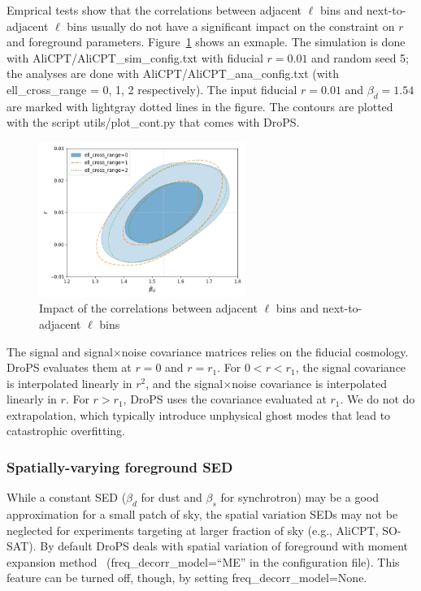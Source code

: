 \documentclass[12pt, a4paper]{ctexart} %
\begin{document}
Emprical tests show that the correlations between adjacent $\ell$ bins and next-to-adjacent $\ell$ bins usually do not have a significant impact on the constraint on $r$ and foreground parameters. Figure~\ref{fig:ell_cross_range} shows an exmaple. The simulation is done with AliCPT/AliCPT\_sim\_config.txt with fiducial $r=0.01$ and random seed 5; the analyses are done with AliCPT/AliCPT\_ana\_config.txt (with ell\_cross\_range = 0, 1, 2 respectively). The input fiducial $r=0.01$ and $\beta_d=1.54$ are marked with lightgray dotted lines in the figure. The contours are plotted with the script utils/plot\_cont.py that comes with DroPS.

\begin{figure}
  \centering
  \includegraphics[width=0.6\textwidth]{AliCPT_ell_cross_range.png}
  \caption{Impact of the correlations between adjacent $\ell$ bins and next-to-adjacent $\ell$ bins\label{fig:ell_cross_range}}
\end{figure}

The signal and signal$\times$noise covariance matrices relies on the fiducial cosmology. DroPS evaluates them at $r=0$ and $r=r_1$. For $0<r<r_1$, the signal covariance is interpolated linearly in $r^2$, and the signal$\times$noise covariance is interpolated linearly in $r$. For $r>r_1$, DroPS uses the covariance evaluated at $r_1$. We do not do extrapolation, which typically introduce unphysical ghost modes that lead to catastrophic overfitting. 

\subsubsection{Spatially-varying foreground SED}

While a constant SED ($\beta_d$ for dust and $\beta_s$ for synchrotron) may be a good approximation for a small patch of sky, the spatial variation SEDs may not be neglected for experiments targeting at larger fraction of sky (e.g., AliCPT, SO-SAT). By default DroPS deals with spatial variation of foreground with moment expansion method~\cite{Chluba17} (freq\_decorr\_model=``ME'' in the configuration file). This feature can be turned off, though, by setting freq\_decorr\_model=None.
\end{document}
